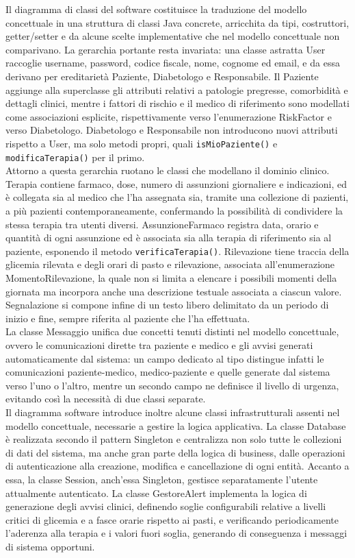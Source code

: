 Il diagramma di classi del software costituisce la traduzione del modello concettuale in una struttura di classi Java concrete, arricchita da tipi, costruttori, getter/setter e da alcune scelte implementative che nel modello concettuale non comparivano. La gerarchia portante resta invariata: una classe astratta User raccoglie username, password, codice fiscale, nome, cognome ed email, e da essa derivano per ereditarietà Paziente, Diabetologo e Responsabile. Il Paziente aggiunge alla superclasse gli attributi relativi a patologie pregresse, comorbidità e dettagli clinici, mentre i fattori di rischio e il medico di riferimento sono modellati come associazioni esplicite, rispettivamente verso l'enumerazione RiskFactor e verso Diabetologo. Diabetologo e Responsabile non introducono nuovi attributi rispetto a User, ma solo metodi propri, quali \texttt{isMioPaziente()} e \texttt{modificaTerapia()} per il primo.\\
Attorno a questa gerarchia ruotano le classi che modellano il dominio clinico. Terapia contiene farmaco, dose, numero di assunzioni giornaliere e indicazioni, ed è collegata sia al medico che l'ha assegnata sia, tramite una collezione di pazienti, a più pazienti contemporaneamente, confermando la possibilità di condividere la stessa terapia tra utenti diversi. AssunzioneFarmaco registra data, orario e quantità di ogni assunzione ed è associata sia alla terapia di riferimento sia al paziente, esponendo il metodo \texttt{verificaTerapia()}. Rilevazione tiene traccia della glicemia rilevata e degli orari di pasto e rilevazione, associata all'enumerazione MomentoRilevazione, la quale non si limita a elencare i possibili momenti della giornata ma incorpora anche una descrizione testuale associata a ciascun valore. Segnalazione si compone infine di un testo libero delimitato da un periodo di inizio e fine, sempre riferita al paziente che l'ha effettuata.\\
La classe Messaggio unifica due concetti tenuti distinti nel modello concettuale, ovvero le comunicazioni dirette tra paziente e medico e gli avvisi generati automaticamente dal sistema: un campo dedicato al tipo distingue infatti le comunicazioni paziente-medico, medico-paziente e quelle generate dal sistema verso l'uno o l'altro, mentre un secondo campo ne definisce il livello di urgenza, evitando così la necessità di due classi separate.\\
Il diagramma software introduce inoltre alcune classi infrastrutturali assenti nel modello concettuale, necessarie a gestire la logica applicativa. La classe Database è realizzata secondo il pattern Singleton e centralizza non solo tutte le collezioni di dati del sistema, ma anche gran parte della logica di business, dalle operazioni di autenticazione alla creazione, modifica e cancellazione di ogni entità. Accanto a essa, la classe Session, anch'essa Singleton, gestisce separatamente l'utente attualmente autenticato. La classe GestoreAlert implementa la logica di generazione degli avvisi clinici, definendo soglie configurabili relative a livelli critici di glicemia e a fasce orarie rispetto ai pasti, e verificando periodicamente l'aderenza alla terapia e i valori fuori soglia, generando di conseguenza i messaggi di sistema opportuni.\\
